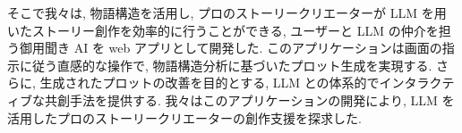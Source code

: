 そこで我々は, 物語構造を活用し, プロのストーリークリエーターが LLM を用いたストーリー創作を効率的に行うことができる, ユーザーと LLM の仲介を担う御用聞き AI を web アプリとして開発した. このアプリケーションは画面の指示に従う直感的な操作で, 物語構造分析に基づいたプロット生成を実現する. さらに, 生成されたプロットの改善を目的とする, LLM との体系的でインタラクティブな共創手法を提供する. 我々はこのアプリケーションの開発により, LLM を活用したプロのストーリークリエーターの創作支援を探求した.


